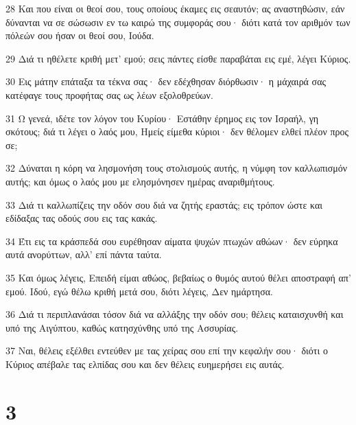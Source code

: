 \par 28 Και που είναι οι θεοί σου, τους οποίους έκαμες εις σεαυτόν; ας αναστηθώσιν, εάν δύνανται να σε σώσωσιν εν τω καιρώ της συμφοράς σου· διότι κατά τον αριθμόν των πόλεών σου ήσαν οι θεοί σου, Ιούδα.
\par 29 Διά τι ηθέλετε κριθή μετ' εμού; σεις πάντες είσθε παραβάται εις εμέ, λέγει Κύριος.
\par 30 Εις μάτην επάταξα τα τέκνα σας· δεν εδέχθησαν διόρθωσιν· η μάχαιρά σας κατέφαγε τους προφήτας σας ως λέων εξολοθρεύων.
\par 31 Ω γενεά, ιδέτε τον λόγον του Κυρίου· Εστάθην έρημος εις τον Ισραήλ, γη σκότους; διά τι λέγει ο λαός μου, Ημείς είμεθα κύριοι· δεν θέλομεν ελθεί πλέον προς σε;
\par 32 Δύναται η κόρη να λησμονήση τους στολισμούς αυτής, η νύμφη τον καλλωπισμόν αυτής; και όμως ο λαός μου με ελησμόνησεν ημέρας αναριθμήτους.
\par 33 Διά τι καλλωπίζεις την οδόν σου διά να ζητής εραστάς; εις τρόπον ώστε και εδίδαξας τας οδούς σου εις τας κακάς.
\par 34 Έτι εις τα κράσπεδά σου ευρέθησαν αίματα ψυχών πτωχών αθώων· δεν εύρηκα αυτά ανορύττων, αλλ' επί πάντα ταύτα.
\par 35 Και όμως λέγεις, Επειδή είμαι αθώος, βεβαίως ο θυμός αυτού θέλει αποστραφή απ' εμού. Ιδού, εγώ θέλω κριθή μετά σου, διότι λέγεις, Δεν ημάρτησα.
\par 36 Διά τι περιπλανάσαι τόσον διά να αλλάξης την οδόν σου; θέλεις καταισχυνθή και υπό της Αιγύπτου, καθώς κατησχύνθης υπό της Ασσυρίας.
\par 37 Ναι, θέλεις εξέλθει εντεύθεν με τας χείρας σου επί την κεφαλήν σου· διότι ο Κύριος απέβαλε τας ελπίδας σου και δεν θέλεις ευημερήσει εις αυτάς.

\chapter{3}


